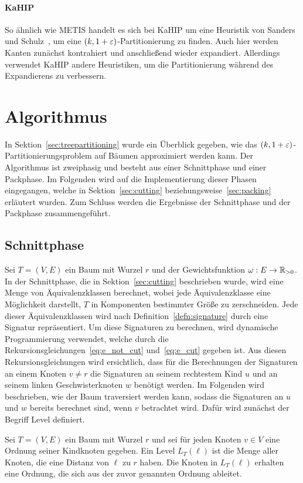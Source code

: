 \paragraph{KaHIP}
So ähnlich wie METIS handelt es sich bei KaHIP um eine Heuristik von Sanders und Schulz~\cite{SS13}, um eine $(k, 1 + \varepsilon)$\hyp Partitionierung zu finden.
Auch hier werden Kanten zunächst kontrahiert und anschließend wieder expandiert.
Allerdings verwendet KaHIP andere Heuristiken, um die Partitionierung während des Expandierens zu verbessern.

\section{Algorithmus}\label{sec:algimpl}
In Sektion~\ref{sec:treepartitioning} wurde ein Überblick gegeben, wie das $(k,1+\varepsilon)$\hyp Partitionierungsproblem auf Bäumen approximiert werden kann. 
Der Algorithmus ist zweiphasig und besteht aus einer Schnittphase und einer Packphase.
Im Folgenden wird auf die Implementierung dieser Phasen eingegangen, welche in Sektion~\ref{sec:cutting} beziehungsweise~\ref{sec:packing} erläutert wurden.
Zum Schluss werden die Ergebnisse der Schnittphase und der Packphase zusammengeführt.

\subsection{Schnittphase}\label{sec:cuttingimpl}
Sei $T=(V,E)$ ein Baum mit Wurzel $r$ und der Gewichtsfunktion $\omega : E \rightarrow \mathbb{R}_{> 0}$.
In der Schnittphase, die in Sektion~\ref{sec:cutting} beschrieben wurde, wird eine Menge von Äquivalenzklassen berechnet, wobei jede Äquivalenzklasse eine Möglichkeit darstellt, $T$ in Komponenten bestimmter Größe zu zerschneiden.
Jede dieser Äquivalenzklassen wird nach Definition~\ref{defn:signature} durch eine Signatur repräsentiert.
Um diese Signaturen zu berechnen, wird dynamische Programmierung verwendet, welche durch die Rekursionsgleichungen~\eqref{eq:e_not_cut} und~\eqref{eq:e_cut} gegeben ist.
Aus diesen Rekursionsgleichungen wird ersichtlich, dass für die Berechnungen der Signaturen an einem Knoten $v \neq r$ die Signaturen an seinem rechtestem Kind $u$ und an seinem linken Geschwisterknoten $w$ benötigt werden.
Im Folgenden wird beschrieben, wie der Baum traversiert werden kann, sodass die Signaturen an $u$ und $w$ bereits berechnet sind, wenn $v$ betrachtet wird. 
Dafür wird zunächst der Begriff Level definiert.

\begin{defn}[Level]\label{def:level}
    Sei $T = (V,E)$ ein Baum mit Wurzel $r$ und sei für jeden Knoten $v \in V$ eine Ordnung seiner Kindknoten gegeben.
    Ein Level $L_T(\ell)$ ist die Menge aller Knoten, die eine Distanz von $\ell$ zu $r$ haben.
    Die Knoten in $L_T(\ell)$ erhalten eine Ordnung, die sich aus der zuvor genannten Ordnung ableitet.
\end{defn}

